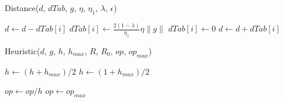 \begin{algorithm}[h!]
	\caption{Distance($d$, $dTab$, $g$, $\eta$, $\eta_1$, $\lambda$, $\epsilon$)}
	\label{algo_dist}
	\begin{algorithmic}
		\STATE $d \leftarrow d-dTab[i]$
		\STATE $dTab[i] \leftarrow \frac{2(1-\lambda)}{\eta_1}\eta \|g\|$
		\ELSE
		\STATE $dTab[i] \leftarrow 0$
		\ENDIF
		\STATE $d \leftarrow d+dTab[i]$
	\end{algorithmic}
\end{algorithm}

\begin{algorithm}[h!]
	\caption{Heuristic($d$, $g$, $h$, $h_{max}$, $R$, $R_0$, $op$, $op_{max}$)}
	\label{algo_heuris}
	\begin{algorithmic}
		\IF{$d<\|g\|$}
		\STATE $h \leftarrow (h+h_{max})/2$	
		\ELSE
		\STATE $h \leftarrow (1+h_{max})/2$	
		\ENDIF
		
		\IF{$R<R_0$}
		\STATE $op \leftarrow op/h$	
		\ELSE
		\STATE $op \leftarrow op_{max}$	
		\ENDIF
	\end{algorithmic}
\end{algorithm}

